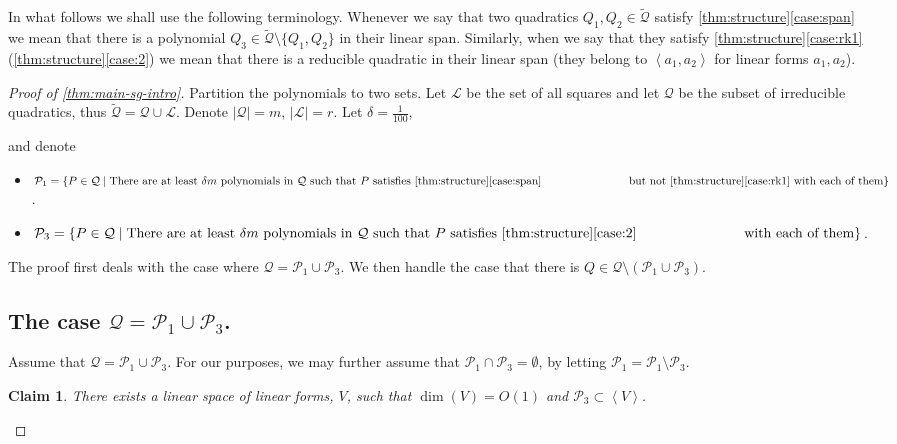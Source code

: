 \documentclass[10pt,a4paper]{article}
\newtheorem{claim}[theorem]{Claim}
\newcommand{\calL}{{\mathcal{L}}}
\newcommand{\cQ}{{\mathcal{Q}}}
\newcommand{\calP}{{\mathcal{P}}}
\newcommand{\ideal}[1]{\left \langle{#1}\right \rangle}
\begin{document}
In what follows we shall use the following terminology. Whenever we say that two quadratics $Q_1,Q_2\in\tilde\cQ$ satisfy \autoref{thm:structure}\ref{case:span} we mean that there is a polynomial $Q_3\in\tilde\cQ\setminus\{Q_1,Q_2\}$ in their linear span. Similarly, when we say that they satisfy \autoref{thm:structure}\ref{case:rk1}  (\autoref{thm:structure}\ref{case:2}) we mean that there is a reducible quadratic in their linear span (they belong to $\ideal{a_1,a_2}$ for linear forms $a_1,a_2$). 


\begin{proof}[Proof of \autoref{thm:main-sg-intro}]


Partition the polynomials to two sets. Let $\calL$ be the set of all squares and let $\cQ$
be the subset of irreducible quadratics, thus $\tilde{\cQ} = \cQ \cup \calL$. Denote $|\cQ| = m$, $|\calL| = r$.
Let $\delta =\frac{1}{100}$, 

and denote
\begin{itemize}

\item  $\calP_1 = \{P\in \cQ \mid \text{There are at least } \delta m \text{ polynomials in } \cQ \text { such that } P \text{ satisfies \autoref{thm:structure}\ref{case:span}} \\ \text{\hspace{2.6cm} but not \autoref{thm:structure}\ref{case:rk1} with each of them} \}$.

\item  $\calP_3 = \{P\in \cQ \mid  \text{There are at least } \delta m \text{ polynomials in } \cQ \text { such that } P \text{ satisfies \autoref{thm:structure}\ref{case:2}} \\ \text{\hspace{2.6cm} 
 with each of them} \}$.
\end{itemize}
The proof first deals with the case where $\cQ = \calP_1\cup \calP_3$. We then handle the case that there is $Q \in \cQ \setminus(\calP_1\cup \calP_3)$.


\subsection{The case $\cQ=\calP_1\cup\calP_3$.}

Assume that $\cQ = \calP_1\cup \calP_3$. For our purposes, we may further assume that $\calP_1\cap \calP_3 = \emptyset$, by letting $\calP_1 = \calP_1 \setminus \calP_3$.

\begin{claim}\label{cla:VforP3}
There exists a linear space of linear forms, $V$, such that $\dim(V)=O(1)$ and $\calP_3 \subset \ideal{V}$.
\end{claim}


\end{proof}
\end{document}

